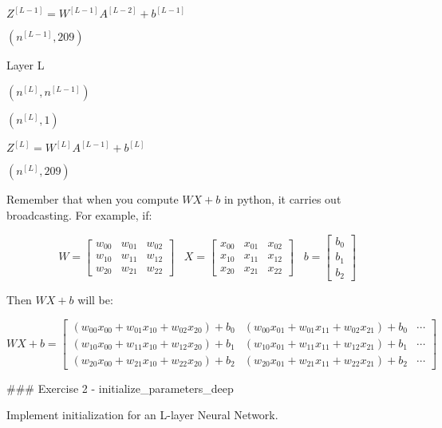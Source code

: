 \documentclass[11pt]{article}
\begin{document}
\(Z^{[L-1]} = W^{[L-1]} A^{[L-2]} + b^{[L-1]}\)

\((n^{[L-1]}, 209)\)

Layer L

\((n^{[L]}, n^{[L-1]})\)

\((n^{[L]}, 1)\)

\(Z^{[L]} = W^{[L]} A^{[L-1]} + b^{[L]}\)

\((n^{[L]}, 209)\)

Remember that when you compute \(W X + b\) in python, it carries out
broadcasting. For example, if:

\[ W = \begin{bmatrix}
    w_{00}  & w_{01} & w_{02} \\
    w_{10}  & w_{11} & w_{12} \\
    w_{20}  & w_{21} & w_{22} 
\end{bmatrix}\;\;\; X = \begin{bmatrix}
    x_{00}  & x_{01} & x_{02} \\
    x_{10}  & x_{11} & x_{12} \\
    x_{20}  & x_{21} & x_{22} 
\end{bmatrix} \;\;\; b =\begin{bmatrix}
    b_0  \\
    b_1  \\
    b_2
\end{bmatrix}\tag{2}\]

Then \(WX + b\) will be:

\[ WX + b = \begin{bmatrix}
    (w_{00}x_{00} + w_{01}x_{10} + w_{02}x_{20}) + b_0 & (w_{00}x_{01} + w_{01}x_{11} + w_{02}x_{21}) + b_0 & \cdots \\
    (w_{10}x_{00} + w_{11}x_{10} + w_{12}x_{20}) + b_1 & (w_{10}x_{01} + w_{11}x_{11} + w_{12}x_{21}) + b_1 & \cdots \\
    (w_{20}x_{00} + w_{21}x_{10} + w_{22}x_{20}) + b_2 &  (w_{20}x_{01} + w_{21}x_{11} + w_{22}x_{21}) + b_2 & \cdots
\end{bmatrix}\tag{3}  \]

    \#\#\# Exercise 2 - initialize\_parameters\_deep

Implement initialization for an L-layer Neural Network.
\end{document}
